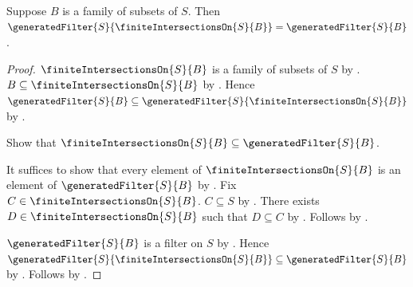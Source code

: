 \begin{theorem}\label{generated_filter_of_finite_intersections_on}
    Suppose $B$ is a family of subsets of $S$.
    Then
        $\generatedFilter{S}{\finiteIntersectionsOn{S}{B}}
        =\generatedFilter{S}{B}$.
\end{theorem}
\begin{proof}
    $\finiteIntersectionsOn{S}{B}$ is a family of subsets of $S$ by
        .
    $B\subseteq\finiteIntersectionsOn{S}{B}$ by
        .
    Hence $\generatedFilter{S}{B}\subseteq
        \generatedFilter{S}{\finiteIntersectionsOn{S}{B}}$ by
        .

    Show that $\finiteIntersectionsOn{S}{B}
        \subseteq\generatedFilter{S}{B}$.
    \begin{subproof}
        It suffices to show that every element of
            $\finiteIntersectionsOn{S}{B}$ is an element of
            $\generatedFilter{S}{B}$ by .
        Fix $C\in\finiteIntersectionsOn{S}{B}$.
        $C\subseteq S$ by .
        There exists $D\in\finiteIntersectionsOn{S}{B}$ such that
            $D\subseteq C$ by .
        Follows by .
    \end{subproof}
    $\generatedFilter{S}{B}$ is a filter on $S$ by
        .
    Hence $\generatedFilter{S}{\finiteIntersectionsOn{S}{B}}
        \subseteq\generatedFilter{S}{B}$ by
        .
    Follows by .
\end{proof}

